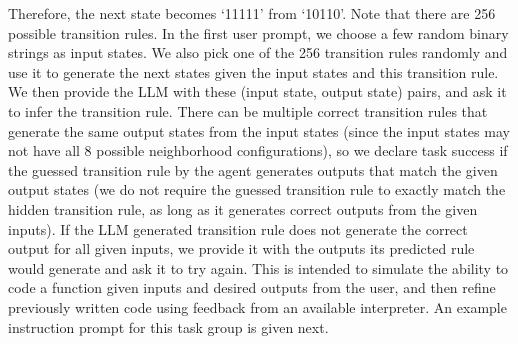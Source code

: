 \documentclass{article}
\theoremstyle{plain}
\theoremstyle{definition}
\theoremstyle{remark}
\begin{document}
Therefore, the next state becomes `11111' from `10110'.
Note that there are 256 possible transition rules. In the first user prompt, we choose a few random binary strings as input states. We also pick one of the 256 transition rules randomly and use it to generate the next states given the input states and this transition rule. We then provide the LLM with these (input state, output state) pairs, and ask it to infer the transition rule. There can be multiple correct transition rules that generate the same output states from the input states (since the input states may not have all 8 possible neighborhood configurations), so we declare task success if the guessed transition rule by the agent generates outputs that match the given output states (we do not require the guessed transition rule to exactly match the hidden transition rule, as long as it generates correct outputs from the given inputs). If the LLM generated transition rule does not generate the correct output for all given inputs, we provide it with the outputs its predicted rule would generate and ask it to try again. This is intended to simulate the ability to code a function given inputs and desired outputs from the user, and then refine previously written code using feedback from an available interpreter.
An example instruction prompt for this task group is given next.
\newpage
\end{document}
